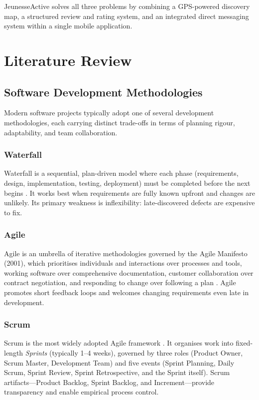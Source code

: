 \documentclass[12pt,a4paper]{report}
\begin{document}
JeunesseActive solves all three problems by combining a GPS-powered discovery map, a structured review and rating system, and an integrated direct messaging system within a single mobile application.

\chapter{Literature Review}

\section{Software Development Methodologies}

Modern software projects typically adopt one of several development methodologies, each carrying distinct trade-offs in terms of planning rigour, adaptability, and team collaboration.

\subsection{Waterfall}
Waterfall is a sequential, plan-driven model where each phase (requirements, design, implementation, testing, deployment) must be completed before the next begins \cite{royce1970}. It works best when requirements are fully known upfront and changes are unlikely. Its primary weakness is inflexibility: late-discovered defects are expensive to fix.

\subsection{Agile}
Agile is an umbrella of iterative methodologies governed by the Agile Manifesto (2001), which prioritises individuals and interactions over processes and tools, working software over comprehensive documentation, customer collaboration over contract negotiation, and responding to change over following a plan \cite{beck2001}. Agile promotes short feedback loops and welcomes changing requirements even late in development.

\subsection{Scrum}
Scrum is the most widely adopted Agile framework \cite{schwaber2020}. It organises work into fixed-length \textit{Sprints} (typically 1–4 weeks), governed by three roles (Product Owner, Scrum Master, Development Team) and five events (Sprint Planning, Daily Scrum, Sprint Review, Sprint Retrospective, and the Sprint itself). Scrum artifacts—Product Backlog, Sprint Backlog, and Increment—provide transparency and enable empirical process control.
\end{document}
